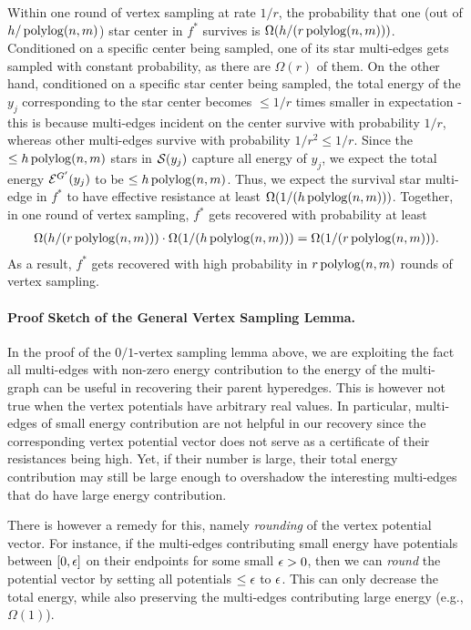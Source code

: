 \documentclass{article}
\begin{document}
Within one round of vertex sampling at rate $1/r$,
the probability that one (out of $h/\operatorname{polylog}(n,m)$)
star center in $f^*$ survives is $\Omega(h/(r\operatorname{polylog}(n,m)))$.
Conditioned on a specific center being sampled, one of its star multi-edges
gets sampled with constant probability, as there are $\Omega(r)$ of them.
On the other hand, conditioned on a specific star center being sampled,
the total energy of the $y_j$ corresponding to the star center becomes
$\leq 1/r$ times smaller in expectation - this is because multi-edges incident on the center
survive with probability $1/r$, whereas other multi-edges survive with probability
$1/r^2 \leq 1/r$.
Since the $\leq h \operatorname{polylog}(n,m)$ stars in $\mathcal{S}(y_j)$ capture all energy of $y_j$,
we expect the total energy $\mathcal{E}^{G'}(y_j)$ to be $\leq h \operatorname{polylog}(n,m)$.
Thus,
we expect the survival star multi-edge in $f^*$ to have effective resistance
at least $\Omega(1/(h\operatorname{polylog}(n,m)))$.
Together, in one round of vertex sampling, $f^*$ gets recovered with probability
at least
\begin{align*}
    \Omega(h/(r\operatorname{polylog}(n,m))) \cdot
    \Omega(1/(h\operatorname{polylog}(n,m)))
    = \Omega(1/(r\operatorname{polylog}(n,m))).
\end{align*}
As a result, $f^*$ gets recovered with high probability in
$r\operatorname{polylog}(n,m)$ rounds of vertex sampling.

\paragraph{Proof Sketch of the General Vertex Sampling Lemma.}
In the proof of the $0/1$-vertex sampling lemma above,
we are exploiting the fact all multi-edges with non-zero energy
contribution to the energy of the multi-graph can be useful in
recovering their parent hyperedges. This is however not true
when the vertex potentials have arbitrary real values.
In particular, multi-edges of small energy contribution
are not helpful in our recovery since the corresponding vertex potential vector
does not serve as a certificate of their resistances being high.
Yet, if their number is large, their total energy contribution may still
be large enough to overshadow the interesting multi-edges that do have large
energy contribution.

There is however a remedy for this, namely \textit{rounding} of the vertex
potential vector. For instance, if the multi-edges contributing small
energy have potentials between $[0,\epsilon]$ on their endpoints
for some small $\epsilon > 0$,
then we can \textit{round} the potential vector by setting
all potentials $\leq \epsilon$ to $\epsilon$.
This can only decrease the total energy, while also preserving
the multi-edges contributing large energy (e.g., $\Omega(1)$).
\end{document}
